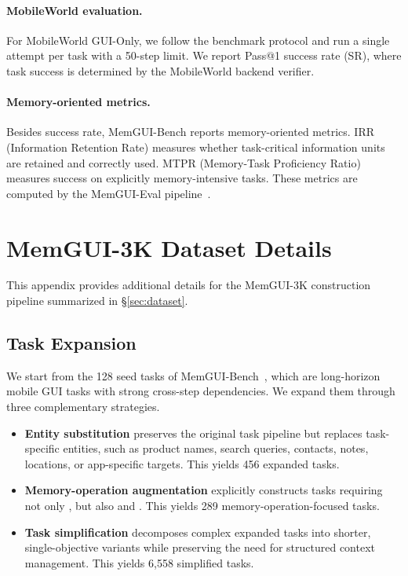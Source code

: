 \paragraph{MobileWorld evaluation.}
For MobileWorld GUI-Only, we follow the benchmark protocol and run a single attempt per task with a 50-step limit. We report Pass@1 success rate (SR), where task success is determined by the MobileWorld backend verifier.

\paragraph{Memory-oriented metrics.}
Besides success rate, MemGUI-Bench reports memory-oriented metrics. IRR (Information Retention Rate) measures whether task-critical information units are retained and correctly used. MTPR (Memory-Task Proficiency Ratio) measures success on explicitly memory-intensive tasks. These metrics are computed by the MemGUI-Eval pipeline~\cite{liu2026memgui}.

\section{MemGUI-3K Dataset Details}
\label{sec:appendix-dataset}

This appendix provides additional details for the MemGUI-3K construction pipeline summarized in \S\ref{sec:dataset}.

\subsection{Task Expansion}
\label{sec:appendix-task-expansion}

We start from the 128 seed tasks of MemGUI-Bench~\cite{liu2026memgui}, which are long-horizon mobile GUI tasks with strong cross-step dependencies. We expand them through three complementary strategies.

\begin{itemize}
    \item \textbf{Entity substitution} preserves the original task pipeline but replaces task-specific entities, such as product names, search queries, contacts, notes, locations, or app-specific targets. This yields 456 expanded tasks.
    \item \textbf{Memory-operation augmentation} explicitly constructs tasks requiring not only , but also  and . This yields 289 memory-operation-focused tasks.
    \item \textbf{Task simplification} decomposes complex expanded tasks into shorter, single-objective variants while preserving the need for structured context management. This yields 6{,}558 simplified tasks.
\end{itemize}

